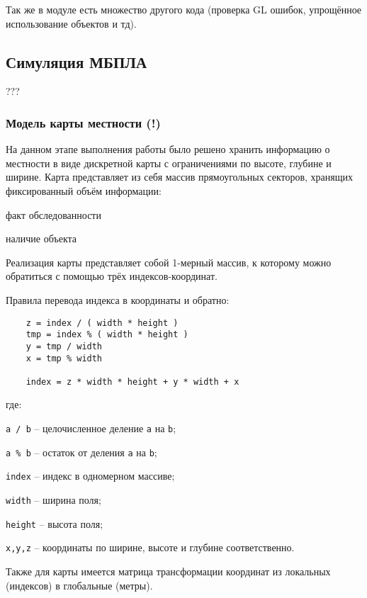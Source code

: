 Так же в модуле есть множество другого кода (проверка GL ошибок, упрощённое использование объектов и тд).

\newpage
\subsection{Симуляция МБПЛА}

???

\newpage
\subsubsection{Модель карты местности (!)}

На данном этапе выполнения работы было решено хранить информацию о местности в
виде дискретной карты с ограничениями по высоте, глубине и ширине. Карта
представляет из себя массив прямоугольных секторов, хранящих фиксированный объём
информации:
\begin{mintemize}
    \item факт обследованности
    \item наличие объекта
\end{mintemize}

Реализация карты представляет собой 1-мерный массив, к которому можно обратиться с помощью трёх
индексов-координат.

Правила перевода индекса в координаты и обратно:

\begin{verbatim}
    z = index / ( width * height )
    tmp = index % ( width * height )
    y = tmp / width
    x = tmp % width

    index = z * width * height + y * width + x
\end{verbatim}
\vspace{-0.5em}

где:

\verb|a / b| -- целочисленное деление \verb|a| на \verb|b|;

\verb|a % b| -- остаток от деления \verb|a| на \verb|b|;

\verb|index| -- индекс в одномерном массиве;

\verb|width| -- ширина поля;

\verb|height| -- высота поля;

\verb|x,y,z| -- координаты по ширине, высоте и глубине соответственно.

Также для карты имеется матрица трансформации координат из локальных (индексов)
в глобальные (метры).

